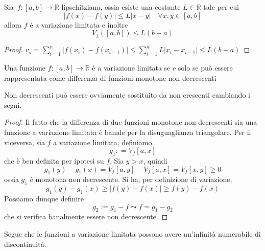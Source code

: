 \begin{proposition}
    Sia~\(f : [a,b] \to \mathbb{R}\) lipschitziana, ossia esiste una costante
    \(L \in \mathbb{R}\) tale per cui
    \[
        |f{(x) - f{(y)}}| \le L|x-y| \quad \forall x, y \in [a,b]   
    \]
    allora \(f\) è a variazione limitata e inoltre
    \[
        V_f{([a,b])} \le L(b-a)
    \]
\end{proposition}
\begin{proof}
    \(v_s = \sum_{i=1}^{n} |f{(x_{i})} -f{(x_{i-1} )}| \le \sum_{i=1}^{n} L |
    x_{i} - x_{i-1} | \le L{(b-a)} \) 
\end{proof}
\begin{theorem}\label{thm:carat_var_lim}
    Una funzione \(f : [a,b] \to \mathbb{R}\) è a variazione limitata se e solo
    se può essere rappresentata come differenza di funzioni monotone non
    decrescenti
\end{theorem}
\begin{remark}
    Non decrescenti può essere ovviamente sostituito da non crescenti cambiando
    i segni.
\end{remark}
\begin{proof}
Il fatto che la differenza di due funzioni monotone non decrescenti sia una
funzione a variazione limitata è banale per la disuguaglianza triangolare. Per il
viceversa, sia \(f\) a variazione limitata, definiamo
\[
    g_1 : = V_f[a, x]
\]
che è ben definita per ipotesi su \(f\). Sia \(y > x\), quindi
\[
 g_1(y) - g_1(x) = V_f[a, y] - V_f[a, x] = V_f [x, y] \ge 0
\]
ossia \(g_1\) è monotona non decrescente. Si ha, per definizione di variazione, 
\[
 g_1(y) - g_1(x) \ge |f(y) - f(x)| \ge f(y)- f(x)
\]
Possiamo dunque definire 
\[
g_2 := g_1 - f \leadsto f = g_1 - g_2
\]
che si verifica banalmente essere non decrescente. 
\end{proof}
\begin{remark}
    Segue che le funzioni a variazione limitata possono avere un'infinità
    numerabile di discontinuità.
\end{remark}

